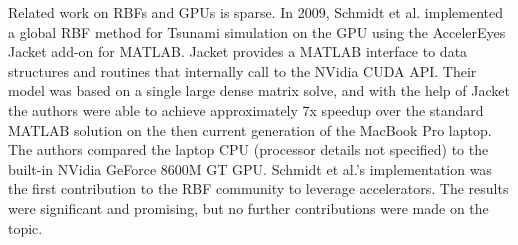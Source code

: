 \documentclass[11pt]{report}
\begin{document}
%
%
%
%
%
%


Related work on RBFs and GPUs is sparse. In 2009, Schmidt et al. \cite{Schmidt2009a, Schmidt2009b} implemented a global RBF method for Tsunami simulation on the GPU using the AccelerEyes Jacket \cite{JacketGuide2009} add-on for MATLAB. Jacket provides a MATLAB interface to data structures and routines that internally call to the NVidia CUDA API. Their model was based on a single large dense matrix solve, and with the help of Jacket the authors were able to achieve approximately 7x speedup over the standard MATLAB solution on the then current generation of the MacBook Pro laptop. The authors compared the laptop CPU (processor details not specified) to the built-in NVidia GeForce 8600M GT GPU. Schmidt et al.'s implementation was the first contribution to the RBF community to leverage accelerators. The results were significant and promising, but no further contributions were made on the topic. 
\end{document}
